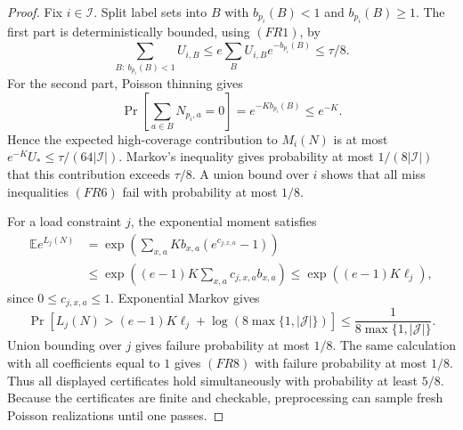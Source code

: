 \documentclass[10pt]{article}
\theoremstyle{definition}
\newcommand{\E}{\mathbb{E}}
\begin{document}
\begin{proof}
   Fix \(i\in\mathcal I\).  Split label sets into
   \(B\) with \(b_{p_i}(B)<1\) and \(b_{p_i}(B)\ge1\).  The first part is
   deterministically bounded, using \((FR1)\), by
   \[
      \sum_{B:\ b_{p_i}(B)<1}U_{i,B}
      \le
      e\sum_B U_{i,B}e^{-b_{p_i}(B)}
      \le \tau/8 .
      \tag{FR9}
   \]
   For the second part, Poisson thinning gives
   \[
      \Pr\!\left[\sum_{a\in B}N_{p_i,a}=0\right]
      =
      e^{-K b_{p_i}(B)}
      \le e^{-K}.
   \]
   Hence the expected high-coverage contribution to \(M_i(N)\) is at most
   \(e^{-K}U_*\le\tau/(64|\mathcal I|)\).  Markov's inequality gives
   probability at most \(1/(8|\mathcal I|)\) that this contribution exceeds
   \(\tau/8\).  A union bound over \(i\) shows that all miss inequalities
   \((FR6)\) fail with probability at most \(1/8\).

   For a load constraint \(j\), the exponential moment satisfies
   \[
   \begin{aligned}
      \E e^{L_j(N)}
      &=
      \exp\!\left(
         \sum_{x,a}K b_{x,a}(e^{c_{j,x,a}}-1)
      \right) \\
      &\le
      \exp\!\left(
         (e-1)K\sum_{x,a}c_{j,x,a}b_{x,a}
      \right)
      \le
      \exp((e-1)K\ell_j),
   \end{aligned}
   \]
   since \(0\le c_{j,x,a}\le1\).  Exponential Markov gives
   \[
      \Pr\!\left[
         L_j(N)>(e-1)K\ell_j+\log(8\max\{1,|\mathcal J|\})
      \right]
      \le\frac1{8\max\{1,|\mathcal J|\}}.
   \]
   Union bounding over \(j\) gives failure probability at most \(1/8\).
   The same calculation with all coefficients equal to \(1\) gives
   \((FR8)\) with failure probability at most \(1/8\).  Thus all displayed
   certificates hold simultaneously with probability at least \(5/8\).
   Because the certificates are finite and checkable, preprocessing can sample
   fresh Poisson realizations until one passes.
\end{proof}
\end{document}
